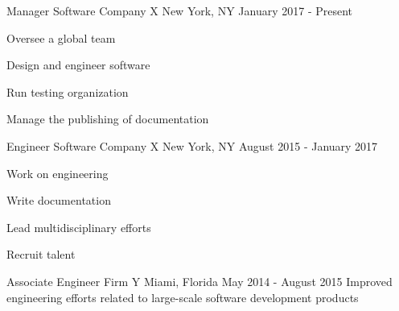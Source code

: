 

\begin{cventries}

  \cventry
    {Manager} %
    {Software Company X} %
    {New York, NY} %
    {January 2017 - Present} %
    {
      \begin{cvitems} %
        \item Oversee a global team
        \item Design and engineer software
        \item Run testing organization
        \item Manage the publishing of documentation
      \end{cvitems}
    }

  \cventry
    {Engineer} %
    {Software Company X} %
    {New York, NY} %
    {August 2015 - January 2017} %
    {
      \begin{cvitems} %
        \item Work on engineering
        \item Write documentation
        \item Lead multidisciplinary efforts
        \item Recruit talent
      \end{cvitems}
    }

  \cventry
    {Associate Engineer} %
    {Firm Y} %
    {Miami, Florida} %
    {May 2014 - August 2015} %
    {
      Improved engineering efforts related to large-scale software development products
    }

\end{cventries}

